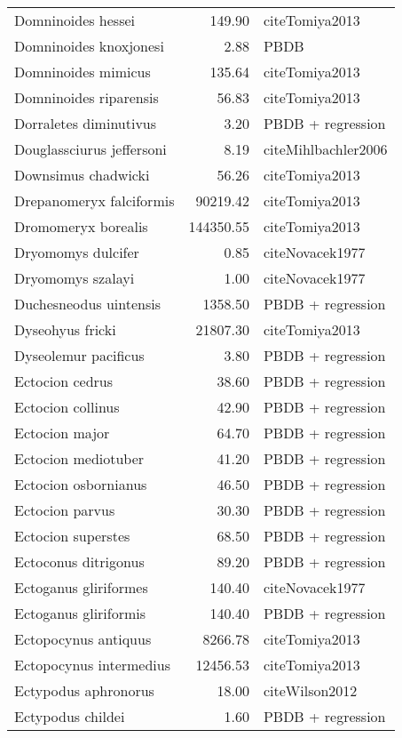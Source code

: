 \begin{table}[ht]
\begin{tabular}{lrl}
  Domninoides hessei & 149.90 & cite{Tomiya2013} \\ 
  Domninoides knoxjonesi & 2.88 & PBDB \\ 
  Domninoides mimicus & 135.64 & cite{Tomiya2013} \\ 
  Domninoides riparensis & 56.83 & cite{Tomiya2013} \\ 
  Dorraletes diminutivus & 3.20 & PBDB + regression \\ 
  Douglassciurus jeffersoni & 8.19 & cite{Mihlbachler2006} \\ 
  Downsimus chadwicki & 56.26 & cite{Tomiya2013} \\ 
  Drepanomeryx falciformis & 90219.42 & cite{Tomiya2013} \\ 
  Dromomeryx borealis & 144350.55 & cite{Tomiya2013} \\ 
  Dryomomys dulcifer & 0.85 & cite{Novacek1977} \\ 
  Dryomomys szalayi & 1.00 & cite{Novacek1977} \\ 
  Duchesneodus uintensis & 1358.50 & PBDB + regression \\ 
  Dyseohyus fricki & 21807.30 & cite{Tomiya2013} \\ 
  Dyseolemur pacificus & 3.80 & PBDB + regression \\ 
  Ectocion cedrus & 38.60 & PBDB + regression \\ 
  Ectocion collinus & 42.90 & PBDB + regression \\ 
  Ectocion major & 64.70 & PBDB + regression \\ 
  Ectocion mediotuber & 41.20 & PBDB + regression \\ 
  Ectocion osbornianus & 46.50 & PBDB + regression \\ 
  Ectocion parvus & 30.30 & PBDB + regression \\ 
  Ectocion superstes & 68.50 & PBDB + regression \\ 
  Ectoconus ditrigonus & 89.20 & PBDB + regression \\ 
  Ectoganus gliriformes & 140.40 & cite{Novacek1977} \\ 
  Ectoganus gliriformis & 140.40 & PBDB + regression \\ 
  Ectopocynus antiquus & 8266.78 & cite{Tomiya2013} \\ 
  Ectopocynus intermedius & 12456.53 & cite{Tomiya2013} \\ 
  Ectypodus aphronorus & 18.00 & cite{Wilson2012} \\ 
  Ectypodus childei & 1.60 & PBDB + regression \\ 

\end{tabular}
\end{table}
